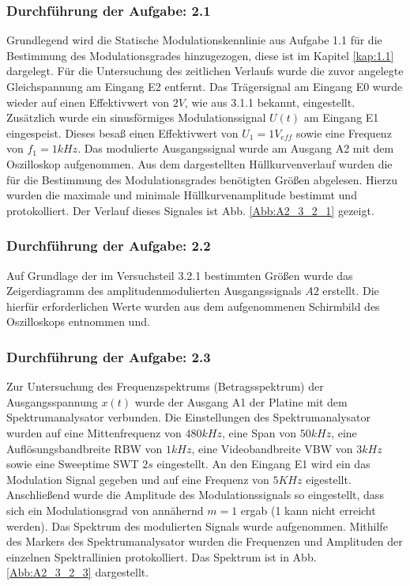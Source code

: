 \documentclass[12pt]{scrartcl}
\begin{document}
\subsubsection*{Durchführung der Aufgabe: 2.1}
Grundlegend wird die Statische Modulationskennlinie aus Aufgabe 1.1 für die Bestimmung des Modulationsgrades hinzugezogen, diese ist im Kapitel \ref{kap:1.1} dargelegt. Für die Untersuchung des zeitlichen 
Verlaufs wurde die zuvor angelegte Gleichspannung am Eingang E2 entfernt. Das Trägersignal am Eingang E0 wurde wieder auf einen Effektivwert von $2 V$, wie aus 3.1.1 bekannt, eingestellt.
 Zusätzlich wurde ein sinusförmiges Modulationssignal $U(t)$ am Eingang E1 eingespeist. Dieses besaß einen Effektivwert von $U_1 = 1 V_{eff}$ sowie eine Frequenz von $f_1=1kHz$.
Das modulierte Ausgangssignal wurde am Ausgang A2 mit dem Oszilloskop aufgenommen. Aus dem dargestellten Hüllkurvenverlauf wurden die für die Bestimmung des Modulationsgrades benötigten
 Größen abgelesen. Hierzu wurden die maximale und minimale Hüllkurvenamplitude bestimmt und protokolliert. Der Verlauf dieses Signales ist Abb. \ref{Abb:A2_3_2_1} gezeigt. 







\subsubsection*{Durchführung der Aufgabe: 2.2}
Auf Grundlage der im Versuchsteil 3.2.1 bestimmten Größen wurde das Zeigerdiagramm des amplitudenmodulierten Ausgangssignals $A2$ erstellt. Die hierfür erforderlichen Werte wurden aus dem 
aufgenommenen Schirmbild des Oszilloskops entnommen und.


\subsubsection*{Durchführung der Aufgabe: 2.3}
Zur Untersuchung des Frequenzspektrums (Betragsspektrum) der Ausgangsspannung $x(t)$ wurde der Ausgang A1 der Platine mit dem Spektrumanalysator verbunden. Die Einstellungen des 
Spektrumanalysator wurden auf eine Mittenfrequenz von $480 kHz$, eine Span von $50 kHz$, eine Auflösungsbandbreite RBW von $1 kHz$, eine Videobandbreite VBW von $3 kHz$ sowie eine 
Sweeptime SWT $2 s$ eingestellt. An den Eingang E1 wird ein das Modulation Signal gegeben und auf eine Frequenz von $5 KHz$ eigestellt. \\
Anschließend wurde die Amplitude des Modulationssignals so eingestellt, dass sich ein Modulationsgrad von annähernd $m = 1$ ergab (1 kann nicht erreicht werden). 
Das Spektrum des modulierten Signals wurde aufgenommen. Mithilfe des Markers des Spektrumanalysator wurden die Frequenzen und Amplituden der einzelnen Spektrallinien protokolliert.
 Das Spektrum ist in Abb. \ref{Abb:A2_3_2_3} dargestellt. 
\end{document}
